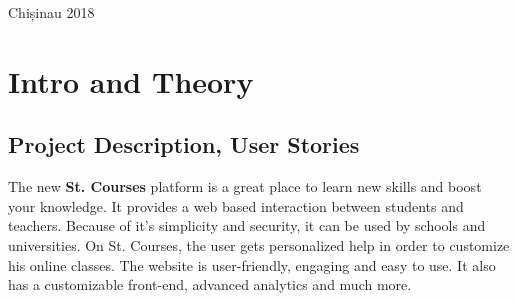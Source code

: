 \documentclass[12pt,a4paper,titlepage]{article}
\begin{document}
\begin{titlepage}
\begin{center}
      \vspace{5 mm}


      {\large Chișinau 2018}\\[3cm] %




      \vfill %
      \end{center}
      
\end{titlepage}

\cleardoublepage
   \tableofcontents
\newpage

\setcounter{page}{1}
\setcounter{secnumdepth}{4}

\cleardoublepage


{}

\section{Intro and Theory}
\subsection{Project Description, User Stories}
The new \textbf{St. Courses} platform is a great place to learn new skills and boost your knowledge. It provides a web based interaction between students and teachers. Because of it's simplicity and security, it can be used by schools and universities. On St. Courses, the user gets personalized help in order to customize his online classes.
The website is user-friendly, engaging and easy to use. It also has a customizable front-end, advanced analytics and much more.
\end{document}
